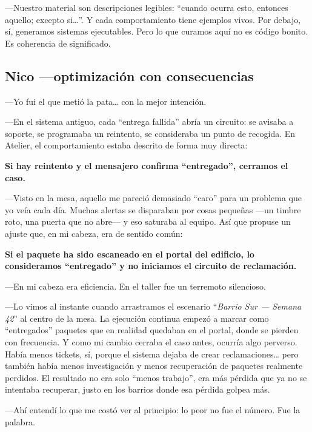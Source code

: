 \documentclass[11pt,a4paper]{article}
\begin{document}
---Nuestro material son descripciones legibles: ``cuando ocurra esto, entonces
aquello; excepto si\ldots''. Y cada comportamiento tiene ejemplos vivos. Por
debajo, sí, generamos sistemas ejecutables. Pero lo que curamos aquí no es
código bonito. Es coherencia de significado.

\subsection{Nico ---optimización con consecuencias}

---Yo fui el que metió la pata\ldots{} con la mejor intención.

---En el sistema antiguo, cada ``entrega fallida'' abría un circuito: se
avisaba a soporte, se programaba un reintento, se consideraba un punto de
recogida. En Atelier, el comportamiento estaba descrito de forma muy directa:

\begin{center}
\textbf{Si hay reintento y el mensajero confirma ``entregado'', cerramos el
caso.}
\end{center}

---Visto en la mesa, aquello me pareció demasiado ``caro'' para un problema
que yo veía cada día. Muchas alertas se disparaban por cosas pequeñas ---un
timbre roto, una puerta que no abre--- y eso saturaba al equipo. Así que
propuse un ajuste que, en mi cabeza, era de sentido común:

\begin{center}
\textbf{Si el paquete ha sido escaneado en el portal del edificio, lo
consideramos ``entregado'' y no iniciamos el circuito de reclamación.}
\end{center}

---En mi cabeza era eficiencia. En el taller fue un terremoto silencioso.

---Lo vimos al instante cuando arrastramos el escenario ``\emph{Barrio Sur ---
Semana 42}'' al centro de la mesa. La ejecución continua empezó a marcar como
``entregados'' paquetes que en realidad quedaban en el portal, donde se
pierden con frecuencia. Y como mi cambio cerraba el caso antes, ocurría algo
perverso. Había menos tickets, sí, porque el sistema dejaba de crear
reclamaciones\ldots{} pero también había menos investigación y menos
recuperación de paquetes realmente perdidos. El resultado no era solo ``menos
trabajo'', era más pérdida que ya no se intentaba recuperar, justo en los
barrios donde esa pérdida golpea más.

---Ahí entendí lo que me costó ver al principio: lo peor no fue el número. Fue
la palabra.
\end{document}
